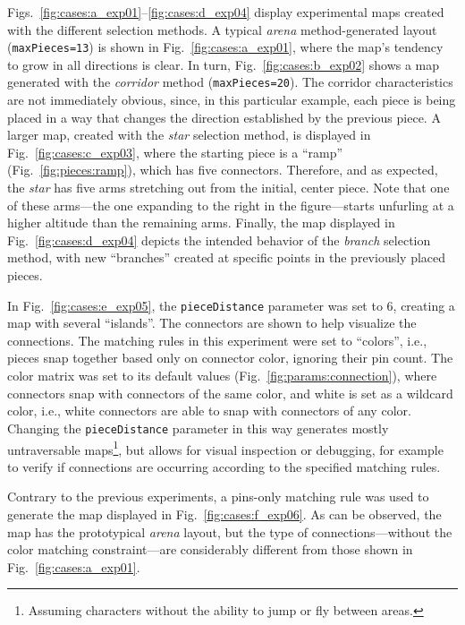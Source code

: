 \documentclass[journal]{IEEEtran}
\begin{document}
Figs.~\ref{fig:cases:a_exp01}--\ref{fig:cases:d_exp04} display experimental maps created
with the different selection methods. A typical \textit{arena} method-generated layout
(\texttt{maxPieces=13}) is shown in Fig.~\ref{fig:cases:a_exp01}, where the map's tendency
to grow in all directions is clear. In turn, Fig.~\ref{fig:cases:b_exp02} shows a
map generated with the \textit{corridor} method (\texttt{maxPieces=20}). The
corridor characteristics are not immediately obvious, since, in this particular
example, each piece is being placed in a way that changes the direction established by
the previous piece. A larger map, created with the \textit{star} selection method, is
displayed in Fig.~\ref{fig:cases:c_exp03}, where the starting piece is a ``ramp''
(Fig.~\ref{fig:pieces:ramp}), which has five connectors. Therefore, and as expected,
the \textit{star} has five arms stretching out from the initial, center piece. Note
that one of these arms---the one expanding to the right in the figure---starts unfurling
at a higher altitude than the remaining arms. Finally, the map displayed in
Fig.~\ref{fig:cases:d_exp04} depicts the intended behavior of the \textit{branch}
selection method, with new ``branches'' created at specific points in the previously
placed pieces.

In Fig.~\ref{fig:cases:e_exp05}, the \texttt{pieceDistance} parameter was set to 6,
creating a map with several ``islands''. The connectors are shown to help visualize the
connections. The matching rules in this experiment were set to ``colors'', i.e., pieces snap
together based only on connector color, ignoring their pin count. The color matrix was set to
its default values (Fig.~\ref{fig:params:connection}), where connectors snap with connectors
of the same color, and white is set as a wildcard color, i.e., white connectors are able to
snap with connectors of any color. Changing the \texttt{pieceDistance} parameter in
this way generates mostly untraversable maps\footnote{Assuming characters without the
ability to jump or fly between areas.}, but allows for visual inspection or debugging,
for example to verify if connections are occurring according to the specified matching rules.

Contrary to the previous experiments, a pins-only matching rule was used to generate the
map displayed in Fig.~\ref{fig:cases:f_exp06}. As can be observed, the map has the
prototypical \textit{arena} layout, but the type of connections---without the color
matching constraint---are considerably different from those shown in
Fig.~\ref{fig:cases:a_exp01}.
\end{document}

